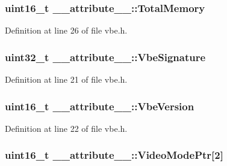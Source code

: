 \subsubsection[{Total\+Memory}]{\setlength{\rightskip}{0pt plus 5cm}uint16\+\_\+t \+\_\+\+\_\+attribute\+\_\+\+\_\+\+::\+Total\+Memory}\label{struct____attribute_____a5659e88b961bf423d6385f315264e005}


Definition at line 26 of file vbe.\+h.

\hypertarget{struct____attribute_____aae97bc03200134a557339f79aeeea94e}{}
\subsubsection[{Vbe\+Signature}]{\setlength{\rightskip}{0pt plus 5cm}uint32\+\_\+t \+\_\+\+\_\+attribute\+\_\+\+\_\+\+::\+Vbe\+Signature}\label{struct____attribute_____aae97bc03200134a557339f79aeeea94e}


Definition at line 21 of file vbe.\+h.

\hypertarget{struct____attribute_____ab50a7a6ed578c30d9411db043c0b34c9}{}
\subsubsection[{Vbe\+Version}]{\setlength{\rightskip}{0pt plus 5cm}uint16\+\_\+t \+\_\+\+\_\+attribute\+\_\+\+\_\+\+::\+Vbe\+Version}\label{struct____attribute_____ab50a7a6ed578c30d9411db043c0b34c9}


Definition at line 22 of file vbe.\+h.

\hypertarget{struct____attribute_____a135a4de316befee6c1415c22e5636f15}{}
\subsubsection[{Video\+Mode\+Ptr}]{\setlength{\rightskip}{0pt plus 5cm}uint16\+\_\+t \+\_\+\+\_\+attribute\+\_\+\+\_\+\+::\+Video\+Mode\+Ptr\mbox{[}2\mbox{]}}\label{struct____attribute_____a135a4de316befee6c1415c22e5636f15}


